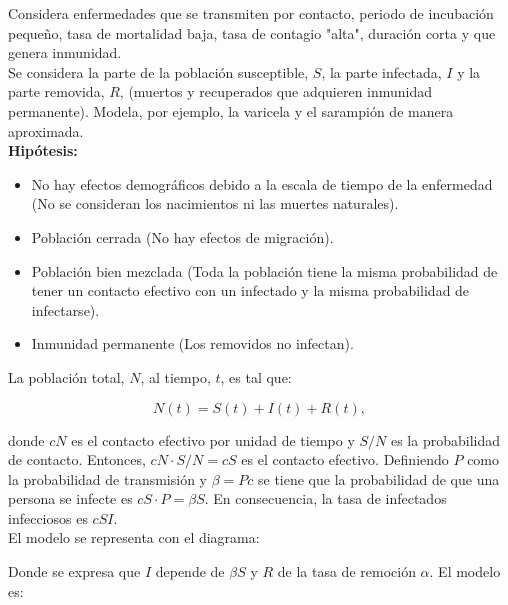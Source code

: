 \documentclass[10pt,oneside]{article}
\begin{document}
\begin{multicols}{2}
    Considera enfermedades que se transmiten por contacto, periodo de incubación pequeño, tasa de mortalidad baja, tasa de contagio "alta", duración corta y que genera inmunidad.\\ \newline Se considera la parte de la población susceptible, $S$, la parte infectada, $I$ y la parte removida, $R$, (muertos y recuperados que adquieren inmunidad permanente). Modela, por ejemplo, la varicela y el sarampión de manera aproximada.\\ \newline \textbf{Hipótesis:}

    \begin{itemize}
        \item No hay efectos demográficos debido a la escala de tiempo de la enfermedad (No se consideran los nacimientos ni las muertes naturales).
        \item Población cerrada (No hay efectos de migración).
        \item Población bien mezclada (Toda la población tiene la misma probabilidad de tener un contacto efectivo con un infectado y la misma probabilidad de infectarse).
        \item Inmunidad permanente (Los removidos no infectan).
    \end{itemize}

    La población total, $N$, al tiempo, $t$, es tal que:
    
    \begin{equation}\label{eq:1}
        N(t)=S(t)+I(t)+R(t),
    \end{equation}
    
    donde $cN$ es el contacto efectivo por unidad de tiempo y $S/N$ es la probabilidad de contacto. Entonces, $cN\cdot S/N=cS$ es el contacto efectivo. Definiendo $P$ como la probabilidad de transmisión y $\beta=Pc$ se tiene que la probabilidad de que una persona se infecte es $cS\cdot P=\beta S$. En consecuencia, la tasa de infectados infecciosos es $cSI$. \\ \newline El modelo se representa con el diagrama:
    \begin{center}\vspace{0.3cm}
       \hspace{0.6cm} 
       \vspace{0.3cm}
    \end{center} Donde se expresa que $I$ depende de $\beta S$ y $R$ de la tasa de remoción $\alpha$. El modelo es:


\end{multicols}
\end{document}

